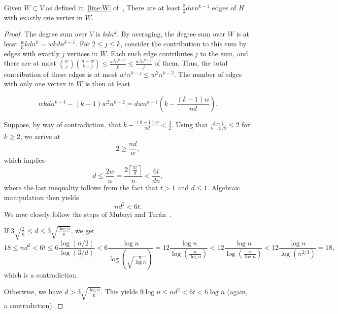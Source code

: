 \begin{lemma}\label{lm:many_edges}
    Given $W  \subset V$ as defined in~\cref{line:W} of~,
    There are at least $\frac{3}{2}dwn^{k-1}$ edges of $H$ with exactly one vertex in $W$.
    \begin{proof}
        The degree sum over $V$ is $kdn^{k}$.
        By averaging, the degree sum over $W$ is at least
        $\frac{w}{n}kdn^{k} = wkdn^{k-1}$.
        For $2 \leq j \leq k$,
        consider the contribution to this sum by edges with exactly $j$ vertices in $W$.
        Each such edge contributes $j$ to the sum, and there are at most
        $\binom{w}{j}\binom{n-w}{k-j} \leq
        \frac{w^j n^{k-j}}{j!} \leq
        \frac{w^j n^{k-j}}{j}$ of them.
        Thus, the total contribution of these edges is at most $w^j n^{k-j} \leq w^{2}n^{k-2}$.
        The number of edges with only one vertex in $W$ is then at least

        \[
            wkdn^{k-1} - (k-1)w^{2}n^{k-2} = dwn^{k-1} \left( k - \frac{(k-1)w}{nd}\right).
        \]

        Suppose, by way of contradiction,
        that $ k - \frac{(k-1)w}{nd} < \frac{3}{2}$.
        Using that $\frac{k-1}{k-3/2} \leq 2$
        for $k \geq 2$, we arrive at
        \[
             2 \geq  \frac{nd}{w},
        \]
        which implies
        \[
            d \leq \frac{2w}{n} = \frac{2 \left\lceil\frac{2t}{d} \right\rceil}{n}
            < \frac{6t}{dn},
        \]
        where the last inequality follows from the fact that $t > 1$ and $d \leq 1$.
        Algebraic manipulation then yields
        \[
            nd^2 < 6t.
        \]
        We now closely follow the steps of Mubayi and Turán~\cite{MUBAYI2010174}.

        If $3\sqrt {\frac{2}{n}} \leq d \leq 3 \sqrt{\frac{\log n}{n}}$, we get
        \[
            18 \leq nd^2
            < 6t \leq
            6 \frac{\log (n/2)}{\log(3/d) } <
            6 \frac{\log n}{\log\left(\sqrt{\frac{n}{\log n}}\right)} =
            12 \frac{\log n}{{\log \left( \frac{n}{\log n} \right)}} <
            12 \frac{\log n}{{\log \left( \frac{n}{\log n} \right)}} <
            12 \frac{\log n}{{\log \left( n^{2/3} \right)}} =
            18,
        \]
        which is a contradiction.

        Otherwise, we have $d > 3 \sqrt{\frac{\log n}{n}}$.
        This yields $9 \log n \leq nd^2 < 6t < 6 \log n$
        (again, a contradiction).
    \end{proof}
\end{lemma}

